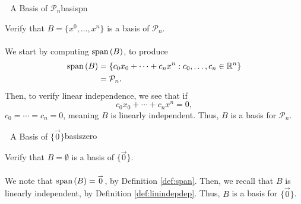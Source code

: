             \begin{example}{\Difficulty\,\Difficulty\,\Difficulty\,\,A Basis of \(\mathcal{P}_n\)}{basispn}

                Verify that \(B=\{x^0,\ldots,x^n\}\) is a basis of \(\mathcal{P}_n\).
                \\
                \\
                We start by computing \(\text{span\,}(B)\), to produce
                \begin{align*}
                    \text{span\,}(B)&=\{c_0x_0+\cdots+c_nx^n:c_0,\ldots,c_n\in\mathbb{R}^n\} \\
                    &=\mathcal{P}_n.
                \end{align*}
                Then, to verify linear independence, we see that if
                \begin{equation*}
                    c_0x_0+\cdots+c_nx^n=0,
                \end{equation*}
                \(c_0=\cdots=c_n=0\), meaning \(B\) is linearly independent. Thus, \(B\) is a basis for \(\mathcal{P}_n\).
            \end{example}
            \begin{example}{\Difficulty\,\Difficulty\,\Difficulty\,\,A Basis of \(\{\vec{0}\}\)}{basiszero}

                Verify that \(B=\emptyset\) is a basis of \(\{\vec{0}\}\).
                \\
                \\
                We note that \(\text{span\,}(B)=\overset{_{\rightharpoonup}}{0}\), by Definition \ref{def:span}. Then, we recall that \(B\) is linearly independent, by Definition \ref{def:linindepdep}. Thus, \(B\) is a basis for \(\{\vec{0}\}\).
            
            \end{example}